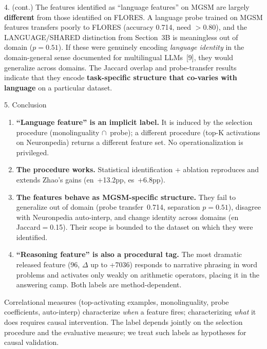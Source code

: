 \documentclass[final]{beamer}
\newlength{\colwidth}
\begin{document}
\begin{frame}[t]
\begin{columns}[t]
\begin{column}{\colwidth}
\begin{block}{4. (cont.)}
    The features identified as ``language features'' on MGSM are largely
    \textbf{different} from those identified on FLORES.
    A language probe trained on MGSM features transfers poorly to FLORES
    (accuracy 0.714, need ${>}$0.80), and the LANGUAGE/SHARED distinction
    from Section~3B is meaningless out of domain ($p{=}0.51$).
    If these were genuinely encoding \emph{language identity} in the
    domain-general sense documented for multilingual LLMs~[9],
    they would generalize across domains. The Jaccard overlap and
    probe-transfer results indicate that they encode
    \textbf{task-specific structure that co-varies with language} on a
    particular dataset.

  \end{block}

  \begin{exampleblock}{5. Conclusion}

    \begin{enumerate}
      \item \textbf{``Language feature'' is an implicit label.}
            It is induced by the selection procedure (monolinguality
            $\cap$~probe); a different procedure (top-K activations on
            Neuronpedia) returns a different feature set. No
            operationalization is privileged.

      \item \textbf{The procedure works.}
            Statistical identification + ablation reproduces and extends
            Zhao's gains (en~+13.2pp, es~+6.8pp).

      \item \textbf{The features behave as MGSM-specific structure.}
            They fail to generalize out of domain (probe transfer~0.714,
            separation $p{=}0.51$), disagree with Neuronpedia auto-interp,
            and change identity across domains (en Jaccard$=$0.15). Their
            scope is bounded to the dataset on which they were identified.

      \item \textbf{``Reasoning feature'' is also a procedural tag.}
            The most dramatic released feature (96, $\Delta$ up to +7036)
            responds to narrative phrasing in word problems and activates
            only weakly on arithmetic operators, placing it in the
            answering camp. Both labels are method-dependent.
    \end{enumerate}

    {\small Correlational measures (top-activating examples, monolinguality,
    probe coefficients, auto-interp) characterize \emph{when} a feature
    fires; characterizing \emph{what} it does requires causal intervention.
    The label depends jointly on the selection procedure and the evaluative
    measure; we treat such labels as hypotheses for causal validation.}


\end{exampleblock}
\end{column}
\end{columns}
\end{frame}
\end{document}
